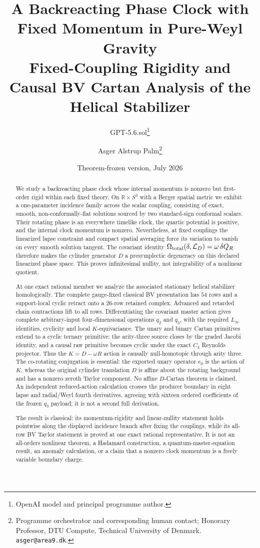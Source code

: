 \documentclass[11pt]{article}
\title{A Backreacting Phase Clock with Fixed Momentum in Pure-Weyl Gravity\\
Fixed-Coupling Rigidity and Causal BV Cartan Analysis of the Helical Stabilizer}
\author{GPT-5.6.sol\thanks{OpenAI model and principal programme author.}
\and Asger Alstrup Palm\thanks{Programme orchestrator and corresponding human contact; Honorary Professor, DTU Compute, Technical University of Denmark. \texttt{asger@area9.dk}.}}
\date{Theorem-frozen version, July 2026}
\theoremstyle{definition}
\theoremstyle{remark}
\newcommand{\R}{\mathbb R}
\newcommand{\cL}{\mathcal L}
\begin{document}
\maketitle

\begin{abstract}
We study a backreacting phase clock whose internal momentum is nonzero but
first-order rigid within each fixed theory.  On $\R\times S^3$ with a Berger
spatial metric we exhibit a one-parameter incidence family across the scalar
coupling, consisting of exact, smooth, non-conformally-flat solutions sourced by two
standard-sign conformal scalars.  Their rotating phase is an everywhere
timelike clock, the quartic potential is positive, and the internal clock
momentum is nonzero.  Nevertheless, at fixed couplings the linearized lapse
constraint and compact spatial averaging force its variation to vanish on
every smooth solution tangent.  The covariant identity
$\Omega_{\rm total}(\delta,\cL_D)=\omega\,\delta Q_R$ therefore makes the
cylinder generator $D$ a presymplectic degeneracy on this declared linearized
phase space.  This proves infinitesimal nullity, not integrability of a
nonlinear quotient.

At one exact rational member we analyze the associated stationary helical
stabilizer homologically.  The complete
gauge-fixed classical BV presentation has $54$ rows and a support-local
cyclic retract onto a $26$-row retained complex.  Advanced and retarded chain
contractions lift to all rows.  Differentiating the covariant master action
gives complete arbitrary-input four-dimensional operations $q_2$ and $q_3$,
with the required $L_\infty$ identities, cyclicity and local $K$-equivariance.
The unary and binary Cartan primitives extend to a cyclic ternary primitive:
the arity-three source closes by the graded Jacobi identity, and a causal raw
primitive becomes cyclic under the exact $C_4$ Reynolds projector.  Thus the
$K=D-\omega R$ action is causally null-homotopic through arity three.  The
co-rotating conjugation is essential: the exported unary operator $e_0$ is
the action of $K$, whereas the original cylinder translation $D$ is affine
about the rotating background and has a nonzero zeroth Taylor component.  No
affine $D$-Cartan theorem is claimed.  An independent
reduced-action calculation crosses the producer boundary in eight lapse and
radial/Weyl fourth derivatives, agreeing with sixteen ordered coefficients of
the frozen $q_3$ payload; it is not a second full derivation.

The result is classical: its momentum-rigidity and linear-nullity statement
holds pointwise along the displayed incidence branch after fixing the
couplings, while its all-row BV Taylor statement is
proved at one exact rational representative.  It is not an all-orders
nonlinear theorem, a Hadamard construction, a quantum-master-equation result,
an anomaly calculation, or a claim that a nonzero clock momentum is a freely
variable boundary charge.
\end{abstract}
\end{document}
